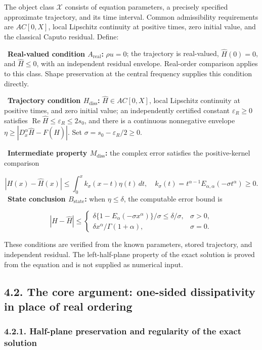 \documentclass[a4paper,11pt]{article}
\begin{document}
The object class \(\mathcal X\) consists of equation parameters, a precisely specified approximate trajectory, and its time interval. Common admissibility requirements are \(AC[0,X]\), local Lipschitz continuity at positive times, zero initial value, and the classical Caputo residual. Define:

\noindent\textbullet\ \textbf{Real-valued condition \(A_{\mathrm{real}}\):} \(\rho u=0\); the trajectory is real-valued, \(\widehat H(0)=0\), and \(\widehat H\le0\), with an independent residual envelope. Real-order comparison applies to this class. Shape preservation at the central frequency supplies this condition directly.\par
\noindent\textbullet\ \textbf{Trajectory condition \(H_{\mathrm{diss}}\):} \(\widehat H\in AC[0,X]\), local Lipschitz continuity at positive times, and zero initial value; an independently certified constant \(\varepsilon_R\ge0\) satisfies \(\operatorname{Re}\widehat H\le\varepsilon_R\le2s_0\), and there is a continuous nonnegative envelope \(\eta\ge|D_x^\alpha\widehat H-F(\widehat H)|\). Set \(\sigma=s_0-\varepsilon_R/2\ge0\).\par
\noindent\textbullet\ \textbf{Intermediate property \(M_{\mathrm{diss}}\):} the complex error satisfies the positive-kernel comparison\par
  \[
  |H(x)-\widehat H(x)|\le\int_0^x k_\sigma(x-t)\eta(t)\,dt,
  \quad k_\sigma(t)=t^{\alpha-1}E_{\alpha,\alpha}(-\sigma t^\alpha)\ge0.
  \tag{R4}
  \]
\noindent\textbullet\ \textbf{State conclusion \(B_{\mathrm{state}}\):} when \(\eta\le\delta\), the computable error bound is\par
  \[
  |H-\widehat H|\le
  \begin{cases}
  \delta\{1-E_\alpha(-\sigma x^\alpha)\}/\sigma\le\delta/\sigma,&\sigma>0,\\
  \delta x^\alpha/\Gamma(1+\alpha),&\sigma=0.
  \end{cases}
  \tag{R5}
  \]

These conditions are verified from the known parameters, stored trajectory, and independent residual. The left-half-plane property of the exact solution is proved from the equation and is not supplied as numerical input.

\subsection*{4.2. The core argument: one-sided dissipativity in place of real ordering}

\subsubsection*{4.2.1. Half-plane preservation and regularity of the exact solution}
\end{document}
